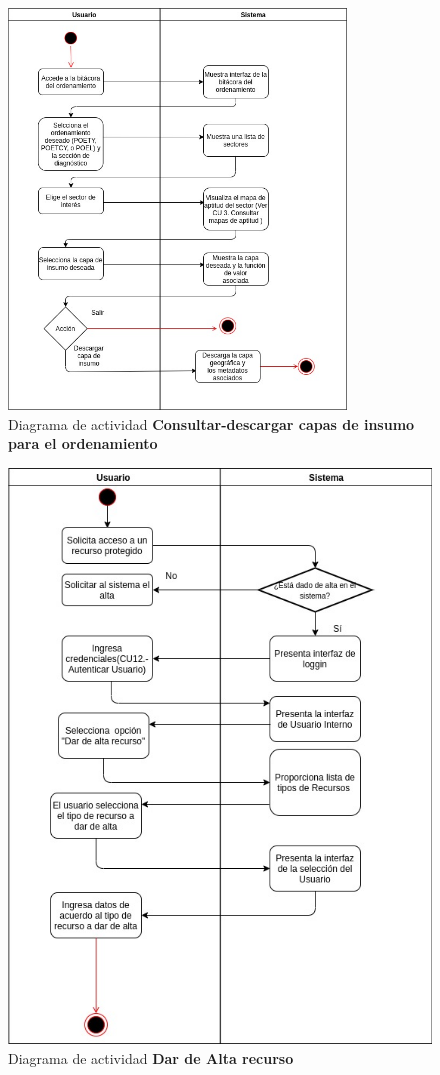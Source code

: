 \pagebreak
\begin{figure}[h]
\centering
\caption{Diagrama de actividad \textbf{Consultar-descargar capas de insumo para el ordenamiento}}\label{fig:priorReq}
\includegraphics[width=0.8\textwidth, height=.5\textwidth]{images/dic_act_consultardescargar_capas_insumo_ordenamiento}
\end{figure}

\useportrait
\restoregeometry


\pagebreak
\begin{figure}[h]
\centering
\caption{Diagrama de actividad \textbf{Dar de Alta recurso}}
\label{fig:priorReq}
\includegraphics[width=1\textwidth, height=1.5\textwidth]{images/diag_act_alta_recurso}
\end{figure}


